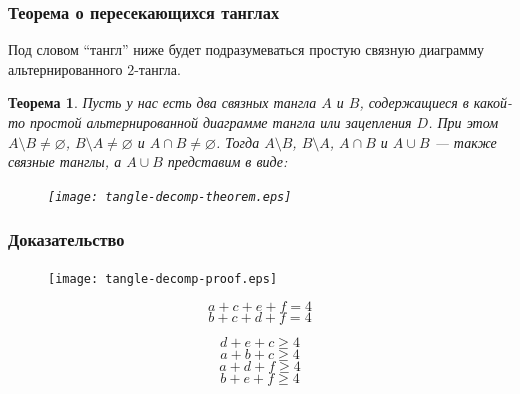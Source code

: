 \documentclass[dvips, intlimits, 9pt, unicode, notheorems]{beamer}
\theoremstyle{plain}
\newtheorem{theorem}{Теорема}
\theoremstyle{definition}
\begin{document}
	\begin{frame}
		\frametitle{Теорема о пересекающихся танглах}

		Под словом ``тангл'' ниже будет подразумеваться простую связную диаграмму альтернированного $2$-тангла.

		\begin{theorem}
			\label{theorem:tangle-decomp-th}
			Пусть у нас есть два связных тангла $A$ и $B$, содержащиеся в какой-то простой альтернированной диаграмме
			тангла или зацепления $D$. При этом $A\setminus B\neq\varnothing$, $B\setminus A\neq\varnothing$
			и $A\cap B\neq\varnothing$. Тогда $A\setminus B$, $B\setminus A$, $A\cap B$ и $A\cup B$ --- также связные
			танглы, а $A\cup B$ представим в виде:

			\begin{figure}[H]
				\centering
				\texttt{[image: tangle-decomp-theorem.eps]}
			\end{figure}
		\end{theorem}
	\end{frame}

	\begin{frame}
		\frametitle{Доказательство}

		\begin{figure}[H]
			\centering
			\texttt{[image: tangle-decomp-proof.eps]}
		\end{figure}

		\begin{equation}
			\label{equation:a_relation}
			a + c + e + f = 4
		\end{equation}
		\begin{equation}
			\label{equation:b_relation}
			b + c + d + f = 4
		\end{equation}

		\begin{equation}
			\label{equation:ab_relation}
			d + e + c \ge 4
		\end{equation}
		\begin{equation}
			\label{equation:all_relation}
			a + b + c \ge 4
		\end{equation}
		\begin{equation}
			\label{equation:amb_relation}
			a + d + f \ge 4
		\end{equation}
		\begin{equation}
			\label{equation:bma_relation}
			b + e + f \ge 4
		\end{equation}
	\end{frame}
\end{document}
